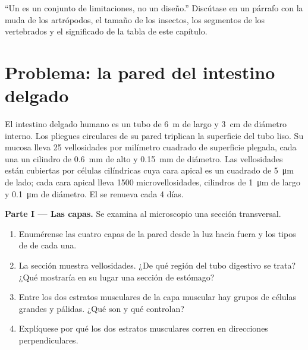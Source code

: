 \begin{exercise}[$\star\star\star$]\label{exo:b1:body-plans-tissues:12}
``Un  es un conjunto de limitaciones, no un diseño.''
Discútase en un párrafo con la muda de los artrópodos, el tamaño de los
insectos, los segmentos de los vertebrados y el significado de la tabla de
este capítulo.
\end{exercise}

\section{Problema: la pared del intestino delgado}

\begin{problem}
\label{pb:b1:body-plans-tissues:1}
El intestino delgado humano es un tubo de \qty{6}{m} de largo y \qty{3}{cm}
de diámetro interno. Los pliegues circulares de su pared triplican la
superficie del tubo liso. Su mucosa lleva \qty{25}{} vellosidades por
milímetro cuadrado de superficie plegada, cada una un cilindro de
\qty{0.6}{mm} de alto y \qty{0.15}{mm} de diámetro. Las vellosidades están
cubiertas por células cilíndricas cuya cara apical es un cuadrado de
\qty{5}{\micro m} de lado; cada cara apical lleva \qty{1500}{}
microvellosidades, cilindros de \qty{1}{\micro m} de largo y
\qty{0.1}{\micro m} de diámetro. El  se renueva cada \qty{4}{}
días.

\medskip
\noindent\textbf{Parte I --- Las capas.}
Se examina al microscopio una sección transversal.
\begin{enumerate}
  \item Enumérense las cuatro capas de la pared desde la luz hacia fuera y
        los tipos de  de cada una.
  \item La sección muestra vellosidades. ¿De qué región del tubo digestivo
        se trata? ¿Qué mostraría en su lugar una sección de estómago?
  \item Entre los dos estratos musculares de la capa muscular hay grupos de
        células grandes y pálidas. ¿Qué son y qué controlan?
  \item Explíquese por qué los dos estratos musculares corren en
        direcciones perpendiculares.
\end{enumerate}


\end{problem}
